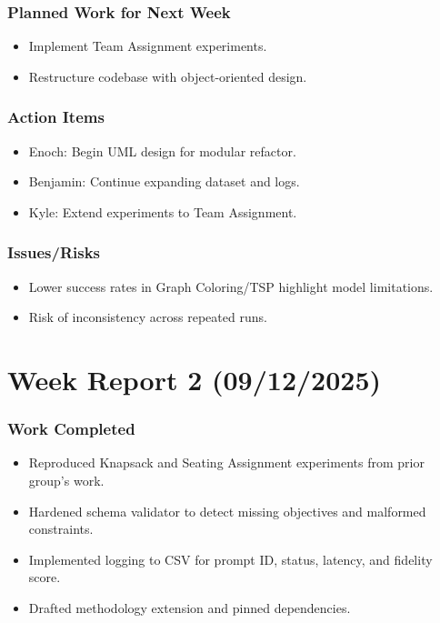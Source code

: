 \subsubsection{Planned Work for Next Week}
\begin{itemize}
  \item Implement Team Assignment experiments. 
  \item Restructure codebase with object-oriented design. 
\end{itemize}

\subsubsection{Action Items}
\begin{itemize}
  \item Enoch: Begin UML design for modular refactor. 
  \item Benjamin: Continue expanding dataset and logs. 
  \item Kyle: Extend experiments to Team Assignment. 
\end{itemize}

\subsubsection{Issues/Risks}
\begin{itemize}
  \item Lower success rates in Graph Coloring/TSP highlight model limitations. 
  \item Risk of inconsistency across repeated runs. 
\end{itemize}

\section{Week Report 2 (09/12/2025)}

\subsubsection{Work Completed}
\begin{itemize}
  \item Reproduced Knapsack and Seating Assignment experiments from prior group’s work. 
  \item Hardened schema validator to detect missing objectives and malformed constraints. 
  \item Implemented logging to CSV for prompt ID, status, latency, and fidelity score. 
  \item Drafted methodology extension and pinned dependencies. 
\end{itemize}

